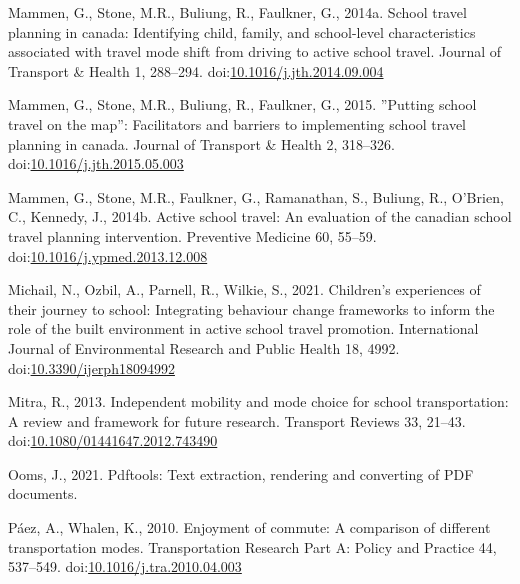 \documentclass[]{elsarticle} %
\newlength{\cslhangindent}
\newlength{\cslentryspacingunit} %
\newenvironment{CSLReferences}[2] %
 {%
  \setlength{\parindent}{0pt}
  \ifodd #1
  \let\oldpar\par
  \def\par{\hangindent=\cslhangindent\oldpar}
  \fi
  \setlength{\parskip}{#2\cslentryspacingunit}
 }%
 {}
\begin{document}
\begin{CSLReferences}{1}{0}
\leavevmode{}%
Mammen, G., Stone, M.R., Buliung, R., Faulkner, G., 2014a. School travel
planning in canada: Identifying child, family, and school-level
characteristics associated with travel mode shift from driving to active
school travel. Journal of Transport \& Health 1, 288--294.
doi:\href{https://doi.org/10.1016/j.jth.2014.09.004}{10.1016/j.jth.2014.09.004}

\leavevmode{}%
Mammen, G., Stone, M.R., Buliung, R., Faulkner, G., 2015. ''Putting
school travel on the map'': Facilitators and barriers to implementing
school travel planning in canada. Journal of Transport \& Health 2,
318--326.
doi:\href{https://doi.org/10.1016/j.jth.2015.05.003}{10.1016/j.jth.2015.05.003}

\leavevmode{}%
Mammen, G., Stone, M.R., Faulkner, G., Ramanathan, S., Buliung, R.,
O'Brien, C., Kennedy, J., 2014b. Active school travel: An evaluation of
the canadian school travel planning intervention. Preventive Medicine
60, 55--59.
doi:\href{https://doi.org/10.1016/j.ypmed.2013.12.008}{10.1016/j.ypmed.2013.12.008}

\leavevmode{}%
Michail, N., Ozbil, A., Parnell, R., Wilkie, S., 2021. Children's
experiences of their journey to school: Integrating behaviour change
frameworks to inform the role of the built environment in active school
travel promotion. International Journal of Environmental Research and
Public Health 18, 4992.
doi:\href{https://doi.org/10.3390/ijerph18094992}{10.3390/ijerph18094992}

\leavevmode{}%
Mitra, R., 2013. Independent mobility and mode choice for school
transportation: A review and framework for future research. Transport
Reviews 33, 21--43.
doi:\href{https://doi.org/10.1080/01441647.2012.743490}{10.1080/01441647.2012.743490}

\leavevmode{}%
Ooms, J., 2021. Pdftools: Text extraction, rendering and converting of
PDF documents.

\leavevmode{}%
Páez, A., Whalen, K., 2010. Enjoyment of commute: A comparison of
different transportation modes. Transportation Research Part A: Policy
and Practice 44, 537--549.
doi:\href{https://doi.org/10.1016/j.tra.2010.04.003}{10.1016/j.tra.2010.04.003}


\end{CSLReferences}
\end{document}
